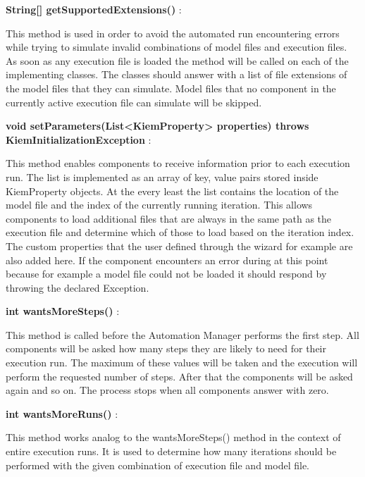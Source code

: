 \begin{description}
 \item \textbf{String[] getSupportedExtensions()} :

This method is used in order to avoid the automated run encountering errors while trying to
simulate invalid combinations of model files and execution files. As soon as any execution file
is loaded the method will be called on each of the implementing classes. The classes should answer
with a list of file extensions of the model files that they can simulate. Model files that no
component in the currently active execution file can simulate will be skipped.

 \item \textbf{void setParameters(List<KiemProperty> properties) throws KiemInitializationException} : 

This method enables components to receive information prior to each execution
run. The list is implemented as an array of key, value pairs stored inside
KiemProperty objects.
At the every least the list contains the location of the model file and the
index of the currently running iteration.
This allows components to load additional files that are always in the
same path as the execution file and determine which of those to load
based on the iteration index.
The custom properties that the user defined through the wizard for example are
also added here.
If the component encounters an error during at this point because for example a model file
could not be loaded it should respond by throwing the declared Exception.

 \item \textbf{int wantsMoreSteps()} : 

This method is called before the Automation Manager performs the first step.
All components will be asked how many steps they are likely to need for their
execution run. The maximum of these values will be taken and the execution
will perform the requested number of steps. After that the components
will be asked again and so on. The process stops when all components
answer with zero.

 \item \textbf{int wantsMoreRuns()} : 

This method works analog to the wantsMoreSteps() method in the context
of entire execution runs. It is used to determine how many iterations
should be performed with the given combination of execution file and model
file.
\end{description}

